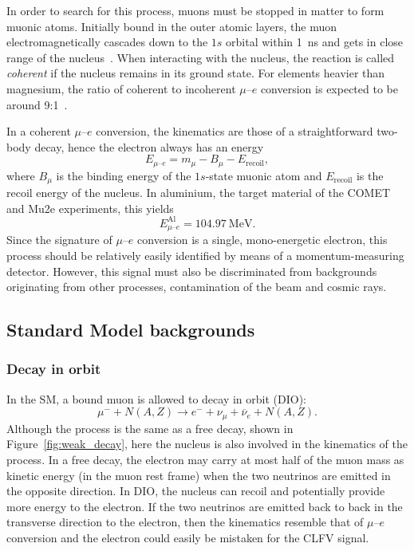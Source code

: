 In order to search for this process, muons must be stopped in matter to form
muonic atoms. Initially bound in the outer atomic layers, the muon
electromagnetically cascades down to the $1s$ orbital within \SI{1}{\ns}
and gets in close range of the nucleus~\cite{Knecht2020}. 
When interacting with the nucleus, the reaction is called \emph{coherent} if the
nucleus remains in its ground state. For elements heavier than magnesium, the
ratio of coherent to incoherent $\mu$--$e$ conversion is expected to be around
9:1~\cite{CHIANG1993526}.

In a coherent $\mu$--$e$ conversion, the kinematics are those of a
straightforward two-body decay, hence the electron always has an energy
\begin{equation*}\label{eq:mu_e_conv_energy}
E_{\mu\text{--}e} = m_\mu - B_\mu - E_\mathrm{recoil},
\end{equation*}
where $B_\mu$ is the binding energy of the $1s$-state muonic atom and
$E_\mathrm{recoil}$ is the recoil energy of the nucleus. In aluminium, the
target material of the COMET and Mu2e experiments, this yields
$$
    E^\mathrm{Al}_{\mu\text{--}e} = \SI{104.97}{\MeV}.
$$
Since the signature of $\mu$--$e$ conversion is a single, mono-energetic
electron, this process should be relatively easily identified by means of a
momentum-measuring detector. However, this signal must also be discriminated
from backgrounds originating from other processes, contamination of the beam and
cosmic rays.

\subsection{Standard Model backgrounds}\label{sec:sm_backgrounds}
\subsubsection{Decay in orbit}
In the SM, a bound muon is allowed to decay in orbit (DIO):
\begin{equation*}\label{eq:dio}
    \mu^- + N(A, Z) \rightarrow e^- + \nu_\mu + \overline{\nu}_e + N(A, Z).
\end{equation*}
Although the process is the same as a free decay, shown in
Figure~\ref{fig:weak_decay}, here the nucleus is also involved in the kinematics
of the process. In a free decay, the electron may carry at most half of the muon
mass as kinetic energy (in the muon rest frame) when the two neutrinos are
emitted in the opposite direction. In DIO, the nucleus can recoil and
potentially provide more energy to the electron. If the two neutrinos are
emitted back to back in the transverse direction to the electron, then the
kinematics resemble that of $\mu$--$e$ conversion and the electron could easily
be mistaken for the CLFV signal. 

